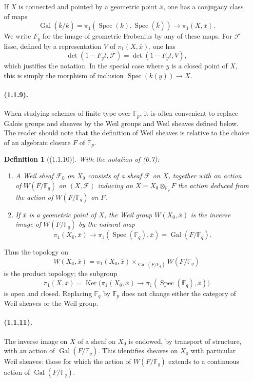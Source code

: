 \documentclass[11pt]{article}
\newtheorem{definition}{Definition}
\theoremstyle{remark}
\newcommand{\Fq}{\mathbb{F}_q}
\newcommand{\Spec}{\operatorname{Spec}}
\newcommand{\Gal}{\operatorname{Gal}}
\newcommand{\Ker}{\operatorname{Ker}}
\begin{document}
If $X$ is connected and pointed by a geometric point $\bar x$, one has a conjugacy class of maps
\[
\Gal(\bar k/k)=\pi_1(\Spec(k),\Spec(\bar k))\longrightarrow \pi_1(X,\bar x).
\]
We write $F_y$ for the image of geometric Frobenius by any of these maps. For $\mathcal F$ lisse, defined by a representation $V$ of $\pi_1(X,\bar x)$, one has
\[
\det(1-F_y t,\mathcal F)=\det(1-F_y t,V),
\]
which justifies the notation. In the special case where $y$ is a closed point of $X$, this is simply the morphism of inclusion $\Spec(k(y))\to X$.

\paragraph{(1.1.9).} When studying schemes of finite type over $\mathbb F_p$, it is often convenient to replace Galois groups and sheaves by the Weil groups and Weil sheaves defined below. The reader should note that the definition of Weil sheaves is relative to the choice of an algebraic closure $F$ of $\mathbb F_p$.

\begin{definition}[(1.1.10)]
With the notation of (0.7):
\begin{enumerate}[label=(\roman*)]
\item A Weil sheaf $\mathcal F_0$ on $X_0$ consists of a sheaf $\mathcal F$ on $X$, together with an action of $W(F/\Fq)$ on $(X,\mathcal F)$ inducing on $X=X_0\otimes_{\Fq}F$ the action deduced from the action of $W(F/\Fq)$ on $F$.
\item If $\bar x$ is a geometric point of $X$, the Weil group $W(X_0,\bar x)$ is the inverse image of $W(F/\Fq)$ by the natural map
\[
\pi_1(X_0,\bar x)\longrightarrow \pi_1(\Spec(\Fq),\bar x)=\Gal(F/\Fq).
\]
\end{enumerate}
\end{definition}

Thus the topology on
\[
W(X_0,\bar x)=\pi_1(X_0,\bar x)\times_{\Gal(F/\Fq)} W(F/\Fq)
\]
is the product topology; the subgroup
\[
\pi_1(X,\bar x)=\Ker\bigl(\pi_1(X_0,\bar x)\to\pi_1(\Spec(\Fq),\bar x)\bigr)
\]
is open and closed. Replacing $\Fq$ by $\mathbb F_p$ does not change either the category of Weil sheaves or the Weil group.

\paragraph{(1.1.11).} The inverse image on $X$ of a sheaf on $X_0$ is endowed, by transport of structure, with an action of $\Gal(F/\Fq)$. This identifies sheaves on $X_0$ with particular Weil sheaves: those for which the action of $W(F/\Fq)$ extends to a continuous action of $\Gal(F/\Fq)$.
\end{document}
